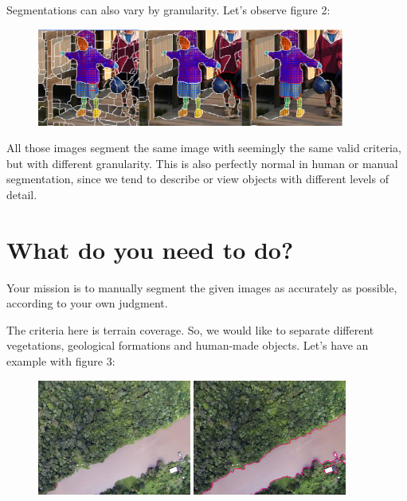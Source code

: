 Segmentations can also vary by granularity. Let's observe figure 2:

\begin{figure}[h!]
  \centering
  \includegraphics[width=0.9\textwidth]{imgs/manualseginstr_fig2}
\end{figure}

\vspace{1in}

All those images segment the same image with seemingly the same valid criteria, but with different granularity. This is also perfectly normal in human or manual segmentation, since we tend to describe or view objects with different levels of detail.

\section*{What do you need to do?}

Your mission is to manually segment the given images as accurately as possible, according to your own judgment.

The criteria here is terrain coverage. So, we would like to separate different vegetations, geological formations and human-made objects. Let's have an example with figure 3:

\begin{figure}[h!]
  \centering
  \includegraphics[width=0.45\textwidth]{imgs/manualseginstr_fig3a}
  \includegraphics[width=0.45\textwidth]{imgs/manualseginstr_fig3b}
\end{figure}


